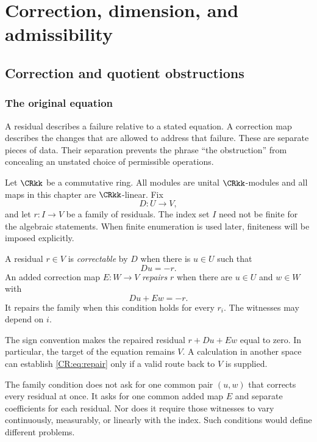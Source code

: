 
\chapter{Correction, dimension, and admissibility}\label{CR:book:chapter-55}
\section{Correction and quotient obstructions}\label{CR:cr-source-section-1}\label{CR:ch:basic}
\subsection{The original equation}
A residual describes a failure relative to a stated equation. A correction map describes the changes that are allowed to address that failure. These are separate pieces of data. Their separation prevents the phrase ``the obstruction'' from concealing an unstated choice of permissible operations.

Let $\CRkk$ be a commutative ring. All modules are unital $\CRkk$-modules and all maps in this chapter are $\CRkk$-linear. Fix
\[
D:U\longrightarrow V,
\]
and let $r:I\to V$ be a family of residuals. The index set $I$ need not be finite for the algebraic statements. When finite enumeration is used later, finiteness will be imposed explicitly.

\begin{CRdefinition}\label{CR:def:repair}
A residual $r\in V$ is \emph{correctable} by $D$ when there is $u\in U$ such that
\begin{equation}\label{CR:eq:correct}
Du=-r.
\end{equation}
An added correction map $E:W\to V$ \emph{repairs} $r$ when there are $u\in U$ and $w\in W$ with
\begin{equation}\label{CR:eq:repair}
Du+Ew=-r.
\end{equation}
It repairs the family when this condition holds for every $r_i$. The witnesses may depend on $i$.
\end{CRdefinition}

The sign convention makes the repaired residual $r+Du+Ew$ equal to zero. In particular, the target of the equation remains $V$. A calculation in another space can establish \eqref{CR:eq:repair} only if a valid route back to $V$ is supplied.

The family condition does not ask for one common pair $(u,w)$ that corrects every residual at once. It asks for one common added map $E$ and separate coefficients for each residual. Nor does it require those witnesses to vary continuously, measurably, or linearly with the index. Such conditions would define different problems.

